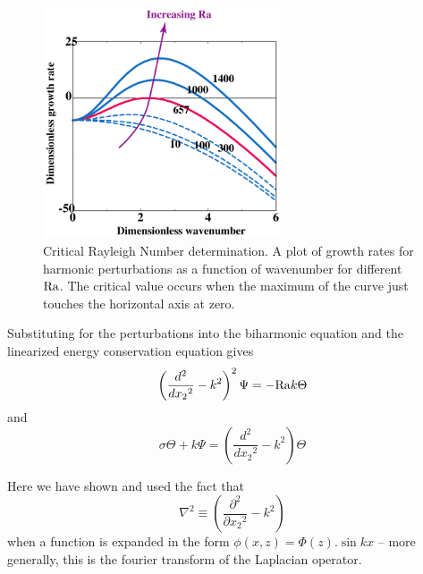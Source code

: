 \documentclass[10pt]{article}
\begin{document}
		
		\begin{figure}[h]
			\begin{center}
				\includegraphics[width=70mm]{Diagrams/crit_ra}
				\caption[]{Critical Rayleigh Number determination. A plot of growth rates for
				harmonic perturbations as a function of wavenumber for different ${\rm Ra}$. The
				critical value occurs when the maximum of the curve just touches the horizontal
				axis at zero.}
			\end{center}	
		\end{figure}
		
		Substituting for the perturbations into the biharmonic equation and the linearized 
		energy conservation equation gives
			\begin{equation}
				\left(\frac{d^2}{d{x_2}^2} -k^2 \right)^2 \Psi = -{\rm Ra} k \Theta	
				\label{eq:psitheta1}
			\end{equation}
		and
			\begin{equation}
				\sigma \Theta + k \Psi = 	\left(\frac{d^2}{d{x_2}^2} -k^2 \right) \Theta
			\end{equation}	
			
		Here we have shown and used the fact that 
			\begin{equation}
				\nabla^2 \equiv \left(\frac{\partial^2}{\partial {x_2}^2} -k^2 \right)
				\label{eq:psitheta2}
			\end{equation}	
		when a function is expanded in the form $\phi(x,z) = \Phi(z).\sin kx$ 
		-- more generally, this is the fourier transform of the Laplacian operator.
		
\end{document}
